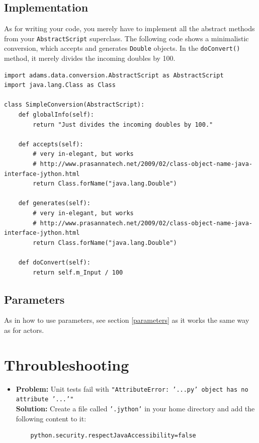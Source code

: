 \documentclass[a4paper]{book}
\begin{document}
\newpage
\section{Implementation}
As for writing your code, you merely have to implement all the abstract methods
from your \texttt{AbstractScript} superclass. The following code shows a
minimalistic conversion, which accepts and generates \texttt{Double}
objects. In the \texttt{doConvert()} method, it merely divides the incoming
doubles by 100.
\begin{verbatim}
import adams.data.conversion.AbstractScript as AbstractScript
import java.lang.Class as Class

class SimpleConversion(AbstractScript):
    def globalInfo(self):
        return "Just divides the incoming doubles by 100."

    def accepts(self):
        # very in-elegant, but works
        # http://www.prasannatech.net/2009/02/class-object-name-java-interface-jython.html
        return Class.forName("java.lang.Double")

    def generates(self):
        # very in-elegant, but works
        # http://www.prasannatech.net/2009/02/class-object-name-java-interface-jython.html
        return Class.forName("java.lang.Double")

    def doConvert(self):
        return self.m_Input / 100
\end{verbatim}
\section{Parameters}
As in how to use parameters, see section \ref{parameters} as it works the
same way as for actors.


\chapter{Throubleshooting}
\begin{itemize}
	\item \textbf{Problem:} Unit tests fail with \texttt{"AttributeError: '...py'
	object has no attribute '...'"} \\
	\textbf{Solution:} Create a file called \texttt{'.jython'} in your home
	directory and add the following content to it: \\
	\begin{verbatim}
    python.security.respectJavaAccessibility=false
	\end{verbatim}
\end{itemize}


\end{document}
